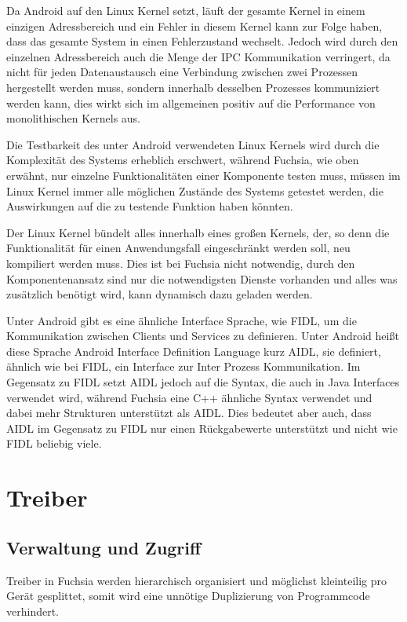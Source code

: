 \documentclass[a4paper]{scrartcl}
\begin{document}
Da Android auf den Linux Kernel setzt, läuft der gesamte Kernel in einem einzigen Adressbereich und ein Fehler in diesem Kernel kann zur Folge haben, dass das gesamte System in einen Fehlerzustand wechselt. Jedoch wird durch den einzelnen Adressbereich auch die Menge der IPC Kommunikation verringert, da nicht für jeden Datenaustausch eine Verbindung zwischen zwei Prozessen hergestellt werden muss, sondern innerhalb desselben Prozesses kommuniziert werden kann, dies wirkt sich im allgemeinen positiv auf die Performance von monolithischen Kernels aus.

Die Testbarkeit des unter Android verwendeten Linux Kernels wird durch die Komplexität des Systems erheblich erschwert, während Fuchsia, wie oben erwähnt, nur einzelne Funktionalitäten einer Komponente testen muss, müssen im Linux Kernel immer alle möglichen Zustände des Systems getestet werden, die Auswirkungen auf die zu testende Funktion haben könnten.

Der Linux Kernel bündelt alles innerhalb eines großen Kernels, der, so denn die Funktionalität für einen Anwendungsfall eingeschränkt werden soll, neu kompiliert werden muss. Dies ist bei Fuchsia nicht notwendig, durch den Komponentenansatz sind nur die notwendigsten Dienste vorhanden und alles was zusätzlich benötigt wird, kann dynamisch dazu geladen werden.

Unter Android gibt es eine ähnliche Interface Sprache, wie FIDL, um die Kommunikation zwischen Clients und Services zu definieren. Unter Android heißt diese Sprache Android Interface Definition Language kurz AIDL, sie definiert, ähnlich wie bei FIDL, ein Interface zur Inter Prozess Kommunikation. Im Gegensatz zu FIDL setzt AIDL jedoch auf die Syntax, die auch in Java Interfaces verwendet wird, während Fuchsia eine C++ ähnliche Syntax verwendet und dabei mehr Strukturen unterstützt als AIDL. Dies bedeutet aber auch, dass AIDL im Gegensatz zu FIDL nur einen Rückgabewerte unterstützt und nicht wie FIDL beliebig viele.
\section{Treiber}
\subsection{Verwaltung und Zugriff}
Treiber in Fuchsia werden hierarchisch organisiert und möglichst kleinteilig pro Gerät gesplittet, somit wird eine unnötige Duplizierung von Programmcode verhindert.
\end{document}
